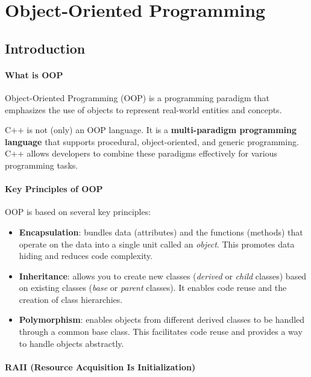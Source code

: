 
\chapter{Object-Oriented Programming}

\section{Introduction}
\subsubsection{What is OOP}

Object-Oriented Programming (OOP) is a programming paradigm that emphasizes the use of objects to represent real-world entities and concepts.

\begin{definitionblock}[OOP in C++]
    C++ is not (only) an OOP language. It is a \textbf{multi-paradigm programming language} that supports procedural, object-oriented, and generic programming. 
    C++ allows developers to combine these paradigms effectively for various programming tasks.
\end{definitionblock}

\subsubsection{Key Principles of OOP}

OOP is based on several key principles:

\begin{itemize}
    \item \textbf{Encapsulation}: bundles data (attributes) and the functions (methods) that operate on the data into a single unit called an \textit{object}. This promotes data hiding and reduces code complexity.
    \item \textbf{Inheritance}: allows you to create new classes (\textit{derived} or \textit{child} classes) based on existing classes (\textit{base} or \textit{parent} classes). It enables code reuse and the creation of class hierarchies.
    \item \textbf{Polymorphism}: enables objects from different derived classes to be handled through a common base class. This facilitates code reuse and provides a way to handle objects abstractly.
\end{itemize}

\subsubsection{RAII (Resource Acquisition Is Initialization)}

